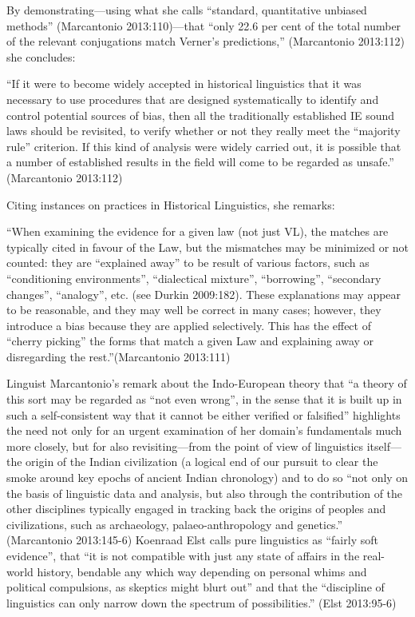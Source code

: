 By demonstrating—using what she calls “standard, quantitative unbiased methods” (Marcantonio 2013:110)—that “only 22.6 per cent of the total number of the relevant conjugations match Verner’s predictions,” (Marcantonio 2013:112) she concludes:

\begin{myquote}
“If it were to become widely accepted in historical linguistics that it was necessary to use procedures that are designed systematically to identify and control potential sources of bias, then all the traditionally established IE sound laws should be revisited, to verify whether or not they really meet the “majority rule” criterion. If this kind of analysis were widely carried out, it is possible that a number of established results in the field will come to be regarded as unsafe.” \hfill (Marcantonio 2013:112)
\end{myquote}

Citing instances on practices in Historical Linguistics, she remarks:

\begin{myquote}
“When examining the evidence for a given law (not just VL), the matches are typically cited in favour of the Law, but the mismatches may be minimized or not counted: they are “explained away” to be result of various factors, such as “conditioning environments”, “dialectical mixture”, “borrowing”, “secondary changes”, “analogy”, etc. (see Durkin 2009:182). These explanations may appear to be reasonable, and they may well be correct in many cases; however, they introduce a bias because they are applied selectively. This has the effect of “cherry picking” the forms that match a given Law and explaining away or disregarding the rest.”\hfill (Marcantonio 2013:111)
\end{myquote}

Linguist Marcantonio’s remark about the Indo-European theory that “a theory of this sort may be regarded as “not even wrong”, in the sense that it is built up in such a self-consistent way that it cannot be either verified or falsified” highlights the need not only for an urgent examination of her domain’s fundamentals much more closely, but for also revisiting—from the point of view of linguistics itself—the origin of the Indian civilization (a logical end of our pursuit to clear the smoke around key epochs of ancient Indian chronology) and to do so “not only on the basis of linguistic data and analysis, but also through the contribution of the other disciplines typically engaged in tracking back the origins of peoples and civilizations, such as archaeology, palaeo-anthropology and genetics.” (Marcantonio 2013:145-6) Koenraad Elst calls pure linguistics as “fairly soft evidence”, that “it is not compatible with just any state of affairs in the real-world history, bendable any which way depending on personal whims and political compulsions, as skeptics might blurt out” and that the “discipline of linguistics can only narrow down the spectrum of possibilities.” (Elst 2013:95-6)

